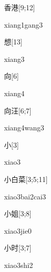 \begin{verbete}{香港}[9;12]
\begin{pronuncia}{xiang1gang3}
\end{pronuncia}
\end{verbete}

\begin{verbete}[xiang3]{想}[13]
\begin{pronuncia}{xiang3}
\end{pronuncia}
\end{verbete}

\begin{verbete}[xiang4]{向}[6]
\begin{pronuncia}{xiang4}
\end{pronuncia}
\end{verbete}

\begin{verbete}{向汪}[6;7]
\begin{pronuncia}{xiang4wang3}
\end{pronuncia}
\end{verbete}

\begin{verbete}[xiao3]{小}[3]
\begin{pronuncia}{xiao3}
\end{pronuncia}
\end{verbete}

\begin{verbete}{小白菜}[3;5;11]
\begin{pronuncia}{xiao3bai2cai3}
\end{pronuncia}
\end{verbete}

\begin{verbete}{小姐}[3;8]
\begin{pronuncia}{xiao3jie0}
\end{pronuncia}
\end{verbete}

\begin{verbete}{小时}[3;7]
\begin{pronuncia}{xiao3shi2}
\end{pronuncia}
\end{verbete}

